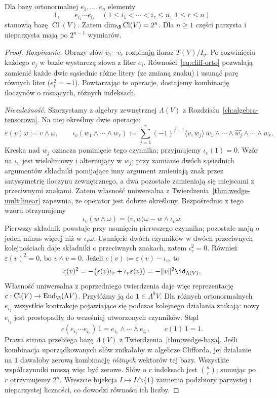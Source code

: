 \begin{twierdzenie}
\label{thm:cliff-baza}
Dla bazy ortonormalnej $e_1,\ldots,e_n$ elementy
\[
 1,\qquad e_{i_1}\cdots e_{i_r}
 \quad(1\leq i_1<\cdots<i_r\leq n,\ 1\leq r\leq n)
\]
stanowią bazę $\operatorname{Cl}(V)$. Zatem
$\dim_\R\operatorname{Cl}(V)=2^n$.
Dla $n\geq1$ części parzysta i nieparzysta mają
po $2^{n-1}$ wymiarów.
\end{twierdzenie}
\begin{proof}
\emph{Rozpinanie.} Obrazy słów $v_1\cdots v_r$
rozpinają iloraz $T(V)/I_q$. Po rozwinięciu każdego
$v_j$ w bazie wystarczą słowa z liter $e_i$.
Równości~\eqref{eq:cliff-orto} pozwalają zamienić
każde dwie sąsiednie różne litery (ze zmianą znaku)
i usunąć parę równych liter ($e_i^2=-1$).
Powtarzając te operacje, dostajemy kombinację
iloczynów o rosnących, różnych indeksach.

\emph{Niezależność.} Skorzystamy z algebry zewnętrznej
$\Lambda(V)$ z Rozdziału~\ref{ch:algebra-tensorowa}.
Na niej określmy dwie operacje:
\[
 \varepsilon(v)\omega:=v\wedge\omega,\qquad
 \iota_v(w_1\wedge\cdots\wedge w_r)
 :=\sum_{j=1}^r(-1)^{j-1}
   \langle v,w_j\rangle\,
   w_1\wedge\cdots\wedge\widehat{w_j}
       \wedge\cdots\wedge w_r .
\]
Kreska nad $w_j$ oznacza pominięcie tego czynnika;
przyjmujemy $\iota_v(1)=0$.
Wzór na $\iota_v$ jest wieloliniowy i alternujący
w $w_j$: przy zamianie dwóch sąsiednich argumentów składniki
pomijające inny argument zmieniają znak przez antysymetrię iloczynu
zewnętrznego, a dwa pozostałe zamieniają się miejscami z przeciwnymi
znakami. Zatem własność uniwersalna
z Twierdzenia~\ref{thm:wedge-multilinear}
zapewnia, że operator jest dobrze określony.
Bezpośrednio z tego wzoru otrzymujemy
\[
 \iota_v(w\wedge\omega)
  =\langle v,w\rangle\omega-w\wedge\iota_v\omega.
\]
Pierwszy składnik powstaje przy usunięciu pierwszego
czynnika; pozostałe mają o jeden minus więcej niż
w $\iota_v\omega$. Usunięcie dwóch czynników
w dwóch przeciwnych kolejnościach daje składniki
o przeciwnych znakach, zatem $\iota_v^2=0$.
Również $\varepsilon(v)^2=0$, bo $v\wedge v=0$.
Jeżeli $c(v):=\varepsilon(v)-\iota_v$, to
\[
 c(v)^2
 =-\bigl(\varepsilon(v)\iota_v
          +\iota_v\varepsilon(v)\bigr)
 =-\|v\|^2\id_{\Lambda(V)}.
\]
Własność uniwersalna z poprzedniego twierdzenia
daje więc reprezentację
$c:\operatorname{Cl}(V)\to\operatorname{End}_\R(\Lambda V)$.
Przyłóżmy ją do $1\in\Lambda^0V$.
Dla różnych ortonormalnych $e_{i_j}$ wszystkie
kontrakcje pojawiające się podczas kolejnego
działania znikają: nowy $e_{i_j}$ jest prostopadły
do wcześniej utworzonych czynników. Stąd
\[
 c(e_{i_1}\cdots e_{i_r})\,1
    =e_{i_1}\wedge\cdots\wedge e_{i_r},\qquad
 c(1)\,1=1.
\]
Prawa strona przebiega bazę $\Lambda(V)$ z
Twierdzenia~\ref{thm:wedge-baza}. Jeśli kombinacja
uporządkowanych słów znikałaby w algebrze Clifforda,
jej działanie na $1$ dawałoby zerową kombinację
\emph{różnych} wektorów tej bazy. Wszystkie
współczynniki muszą więc być zerowe.
Słów o $r$ indeksach jest $\binom nr$;
sumując po $r$ otrzymujemy $2^n$.
Wreszcie bijekcja $I\mapsto I\triangle\{1\}$
zamienia podzbiory parzystej i nieparzystej
liczności, co dowodzi równości ich liczby.
\end{proof}

